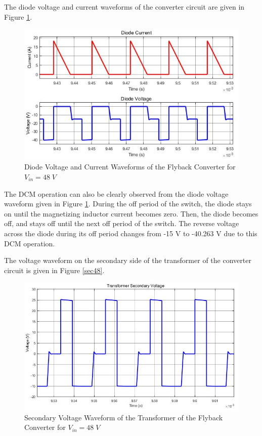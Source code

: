 The diode voltage and current waveforms of the converter circuit are given in Figure \ref{fig:dio48}.

\begin{figure}[H]
\begin{center}
\includegraphics[width=1\textwidth]{diode_curr_volt_48.jpg}
\caption{Diode Voltage and Current Waveforms of the Flyback Converter for $ V_{in} = 48\;V $}
\label{fig:dio48}
\end{center}
\end{figure}

The DCM operation can also be clearly observed from the diode voltage waveform given in Figure \ref{fig:dio48}. During the off period of the switch, the diode stays on until the magnetizing inductor current becomes zero. Then, the diode becomes off, and stays off until the next off period of the switch. The reverse voltage across the diode during its off period changes from -15 V to -40.263 V due to this DCM operation. 

The voltage waveform on the secondary side of the transformer of the converter circuit is given in Figure \ref{sec48}.

\begin{figure}[H]
\begin{center}
\includegraphics[width=1\textwidth]{secondary_voltage_48.jpg}
\caption{Secondary Voltage Waveform of the Transformer of the Flyback Converter for $ V_{in} = 48\;V $}
\label{fig:sec48}
\end{center}
\end{figure}

